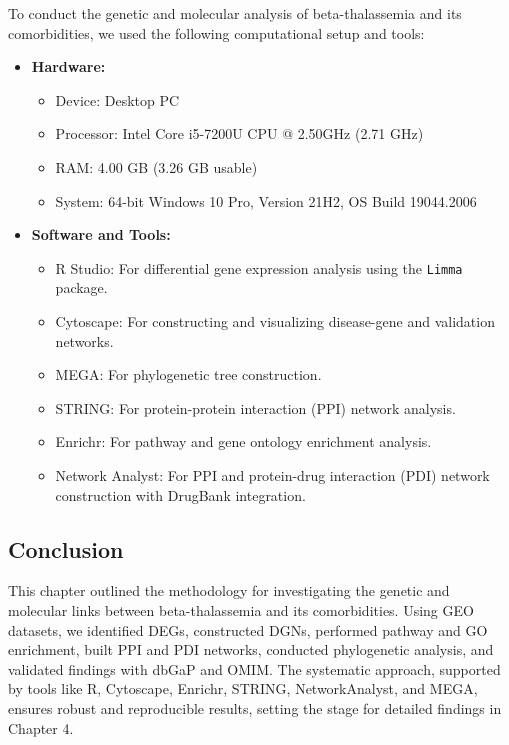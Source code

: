 To conduct the genetic and molecular analysis of beta-thalassemia and its comorbidities, we used the following computational setup and tools:
\begin{itemize}
    \item \textbf{Hardware:}
    \begin{itemize}
        \item Device: Desktop PC
        \item Processor: Intel Core i5-7200U CPU @ 2.50GHz (2.71 GHz)
        \item RAM: 4.00 GB (3.26 GB usable)
        \item System: 64-bit Windows 10 Pro, Version 21H2, OS Build 19044.2006
    \end{itemize}
    \item \textbf{Software and Tools:}
    \begin{itemize}
        \item R Studio: For differential gene expression analysis using the \texttt{Limma} package.
        \item Cytoscape: For constructing and visualizing disease-gene and validation networks.
        \item MEGA: For phylogenetic tree construction.
        \item STRING: For protein-protein interaction (PPI) network analysis.
        \item Enrichr: For pathway and gene ontology enrichment analysis.
        \item Network Analyst: For PPI and protein-drug interaction (PDI) network construction with DrugBank integration.
    \end{itemize}
\end{itemize}

\vspace*{-\parskip}
\subsection{Conclusion}
\label{sec:conclusion}

This chapter outlined the methodology for investigating the genetic and molecular links between beta-thalassemia and its comorbidities. Using GEO datasets, we identified DEGs, constructed DGNs, performed pathway and GO enrichment, built PPI and PDI networks, conducted phylogenetic analysis, and validated findings with dbGaP and OMIM. The systematic approach, supported by tools like R, Cytoscape, Enrichr, STRING, NetworkAnalyst, and MEGA, ensures robust and reproducible results, setting the stage for detailed findings in Chapter 4.
